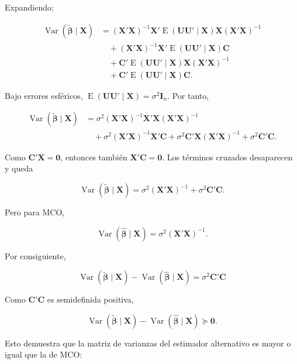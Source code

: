 \documentclass[11pt,a4paper]{article}
\DeclareMathOperator{\E}{E}
\DeclareMathOperator{\Var}{Var}
\begin{document}
Expandiendo:

\begin{align*}
\Var(\tilde{\boldsymbol{\beta}}\mid\mathbf{X})
&=(\mathbf{X}'\mathbf{X})^{-1}\mathbf{X}'\E(\mathbf{U}\mathbf{U}'\mid\mathbf{X})\mathbf{X}(\mathbf{X}'\mathbf{X})^{-1} \\
&\quad +(\mathbf{X}'\mathbf{X})^{-1}\mathbf{X}'\E(\mathbf{U}\mathbf{U}'\mid\mathbf{X})\mathbf{C} \\
&\quad +\mathbf{C}'\E(\mathbf{U}\mathbf{U}'\mid\mathbf{X})\mathbf{X}(\mathbf{X}'\mathbf{X})^{-1} \\
&\quad +\mathbf{C}'\E(\mathbf{U}\mathbf{U}'\mid\mathbf{X})\mathbf{C}.
\end{align*}

Bajo errores esféricos, \(\E(\mathbf{U}\mathbf{U}'\mid\mathbf{X})=\sigma^2\mathbf{I}_n\). Por tanto,

\begin{align*}
\Var(\tilde{\boldsymbol{\beta}}\mid\mathbf{X})
&=\sigma^2(\mathbf{X}'\mathbf{X})^{-1}\mathbf{X}'\mathbf{X}(\mathbf{X}'\mathbf{X})^{-1} \\
&\quad +\sigma^2(\mathbf{X}'\mathbf{X})^{-1}\mathbf{X}'\mathbf{C}
+\sigma^2\mathbf{C}'\mathbf{X}(\mathbf{X}'\mathbf{X})^{-1}
+\sigma^2\mathbf{C}'\mathbf{C}.
\end{align*}

Como \(\mathbf{C}'\mathbf{X}=\mathbf{0}\), entonces también \(\mathbf{X}'\mathbf{C}=\mathbf{0}\). Los términos cruzados desaparecen y queda

\[
\Var(\tilde{\boldsymbol{\beta}}\mid\mathbf{X})
=\sigma^2(\mathbf{X}'\mathbf{X})^{-1}+\sigma^2\mathbf{C}'\mathbf{C}.
\]

Pero para MCO,

\[
\Var(\hat{\boldsymbol{\beta}}\mid\mathbf{X})=\sigma^2(\mathbf{X}'\mathbf{X})^{-1}.
\]

Por consiguiente,

\begin{resultado}
\[
\boxed{
\Var(\tilde{\boldsymbol{\beta}}\mid\mathbf{X})
-\Var(\hat{\boldsymbol{\beta}}\mid\mathbf{X})
=\sigma^2\mathbf{C}'\mathbf{C}
}
\]
\end{resultado}

Como \(\mathbf{C}'\mathbf{C}\) es semidefinida positiva,

\[
\Var(\tilde{\boldsymbol{\beta}}\mid\mathbf{X})
-\Var(\hat{\boldsymbol{\beta}}\mid\mathbf{X})\succeq \mathbf{0}.
\]

Esto demuestra que la matriz de varianzas del estimador alternativo es mayor o igual que la de MCO:
\end{document}
